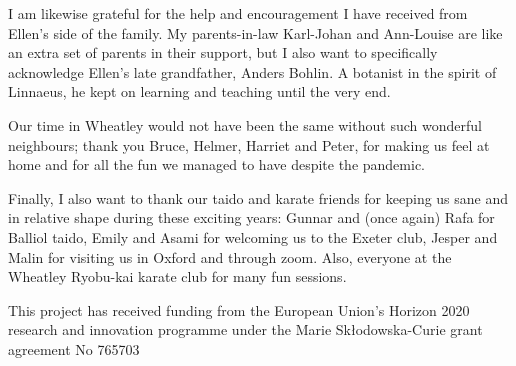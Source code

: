 I am likewise grateful for the help and encouragement I have received from Ellen's side of the family. My parents-in-law Karl-Johan and Ann-Louise are like an extra set of parents in their support, but I also want to specifically acknowledge Ellen's late grandfather, Anders Bohlin. A botanist in the spirit of Linnaeus, he kept on learning and teaching until the very end.

Our time in Wheatley would not have been the same without such wonderful neighbours; thank you Bruce, Helmer, Harriet and Peter, for making us feel at home and for all the fun we managed to have despite the pandemic.

Finally, I also want to thank our taido and karate friends for keeping us sane and in relative shape during these exciting years: Gunnar and (once again) Rafa for Balliol taido, Emily and Asami for welcoming us to the Exeter club, Jesper and Malin for visiting us in Oxford and through zoom. Also, everyone at the Wheatley Ryobu-kai karate club for many fun sessions.




This project has received funding from the European Union's Horizon 2020 research and innovation programme under the Marie Skłodowska-Curie grant agreement No 765703
